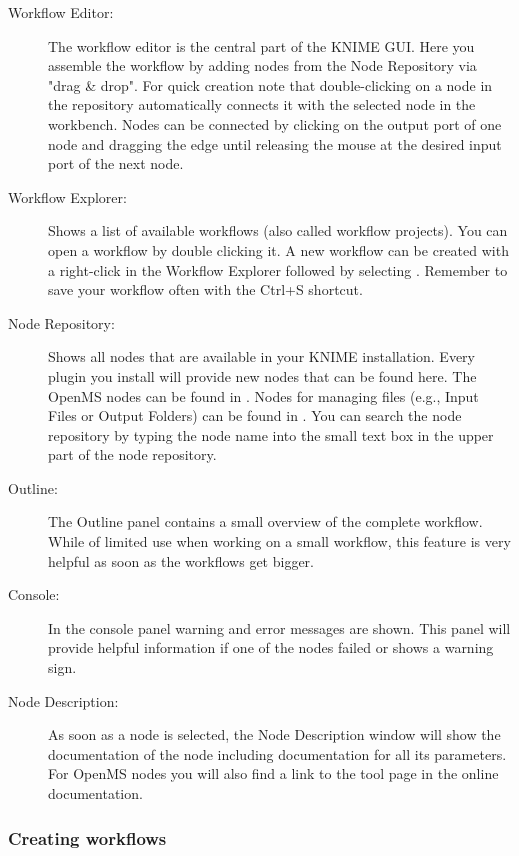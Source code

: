 \begin{description}
\item[Workflow Editor:]
The workflow editor is the central part of the KNIME GUI.
Here you assemble the workflow by adding nodes from the Node Repository via "drag \& drop". For quick creation note that double-clicking on 
a node in the repository automatically connects it with the selected node in the workbench.
Nodes can be connected by clicking on the output port of one node and dragging the edge until releasing the mouse at the desired input port 
of the next node.

\item[Workflow Explorer:]
Shows a list of available workflows (also called workflow projects).
You can open a workflow by double clicking it.
A new workflow can be created with a right-click in the Workflow Explorer followed by selecting .
Remember to save your workflow often with the Ctrl+S shortcut.

\item[Node Repository:]
Shows all nodes that are available in your KNIME installation.
Every plugin you install will provide new nodes that can be found here.
The OpenMS nodes can be found in .
Nodes for managing files (e.g., Input Files or Output Folders) can be found in .
You can search the node repository by typing the node name into the small text box in the upper part of the node repository.

\item[Outline:]
The Outline panel contains a small overview of the complete workflow. While of limited use when working on a small workflow, this feature is very helpful as soon as the workflows get bigger.

\item[Console:]
In the console panel warning and error messages are shown.
This panel will provide helpful information if one of the nodes failed or shows a warning sign.

\item[Node Description:]
As soon as a node is selected, the Node Description window will show the documentation of the node including documentation for all its parameters.
For OpenMS nodes you will also find a link to the tool page in the online documentation.

\end{description}

\subsubsection{Creating workflows}
\label{sec:create_workflows}

